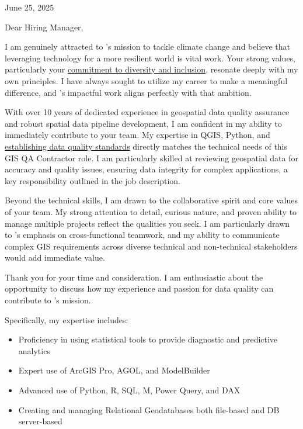 \documentclass[letterpaper]{article}
\newcommand{\impt}[1]{\uline{#1}}
\newenvironment{itemlist}
        {
            \vspace{-12pt}
            \begin{itemize} \itemsep 0pt
        }{
            \end{itemize}
            \vspace{-3pt}
        }
\begin{document}
\large

\null\hfill June 25, 2025

Dear Hiring Manager,

I am genuinely attracted to {\JobCompany}'s mission to tackle climate change and believe that leveraging technology for a more resilient world is vital work.
Your strong values, particularly your \impt{commitment to diversity and inclusion}, resonate deeply with my own principles.
I have always sought to utilize my career to make a meaningful difference, and {\JobCompany}'s impactful work aligns perfectly with that ambition.

With over 10 years of dedicated experience in geospatial data quality assurance and robust spatial data pipeline development,
I am confident in my ability to immediately contribute to your team.
My expertise in QGIS, Python, and \impt{establishing data quality standards} directly matches the technical needs of this GIS QA Contractor role.
I am particularly skilled at reviewing geospatial data for accuracy and quality issues,
ensuring data integrity for complex applications, a key responsibility outlined in the job description.

Beyond the technical skills, I am drawn to the collaborative spirit and core values of your team.
My strong attention to detail, curious nature, and proven ability to manage multiple projects reflect the qualities you seek.
I am particularly drawn to {\JobCompany}’s emphasis on cross-functional teamwork,
and my ability to communicate complex GIS requirements across diverse technical and non-technical stakeholders would add immediate value.

Thank you for your time and consideration.
I am enthusiastic about the opportunity to discuss how my experience and passion for data quality can contribute to {\JobCompany}'s mission.


\iffalse
Specifically, my expertise includes:
\begin{itemlist}
\item Proficiency in using statistical tools to provide diagnostic and predictive analytics
\item Expert use of ArcGIS Pro, AGOL, and ModelBuilder
\item Advanced use of Python, R, SQL, M, Power Query, and DAX
\item Creating and managing Relational Geodatabases both file-based and DB server-based
\end{itemlist}
\end{document}
